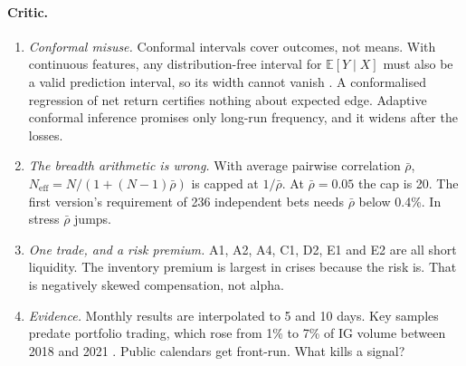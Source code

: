 \documentclass[11pt,letterpaper]{article}
\newcommand{\E}{\mathbb{E}}
\newcommand{\Neff}{N_{\mathrm{eff}}}
\begin{document}
\paragraph{Critic.}
\begin{enumerate}[itemsep=2pt,topsep=2pt]
\item \emph{Conformal misuse.} Conformal intervals cover outcomes, not means. With continuous features, any distribution-free interval for $\E[Y\mid X]$ must also be a valid prediction interval, so its width cannot vanish \cite{lb2021}. A conformalised regression of net return certifies nothing about expected edge. Adaptive conformal inference \cite{gc2021} promises only long-run frequency, and it widens after the losses.
\item \emph{The breadth arithmetic is wrong.} With average pairwise correlation $\bar\rho$, $\Neff=N/(1+(N-1)\bar\rho)$ is capped at $1/\bar\rho$. At $\bar\rho=0.05$ the cap is 20. The first version's requirement of 236 independent bets needs $\bar\rho$ below 0.4\%. In stress $\bar\rho$ jumps.
\item \emph{One trade, and a risk premium.} A1, A2, A4, C1, D2, E1 and E2 are all short liquidity. The inventory premium is largest in crises because the risk is. That is negatively skewed compensation, not alpha.
\item \emph{Evidence.} Monthly results are interpolated to 5 and 10 days. Key samples predate portfolio trading, which rose from 1\% to 7\% of IG volume between 2018 and 2021 \cite{mt2023}. Public calendars get front-run. What kills a signal?
\end{enumerate}
\end{document}
